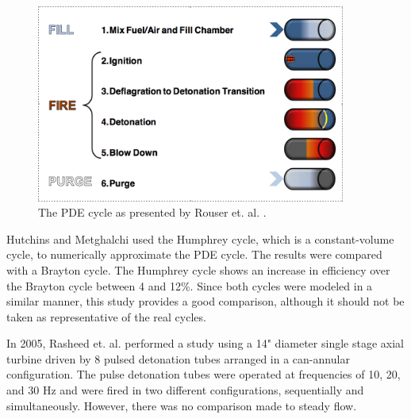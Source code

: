 \documentclass[12pt, letterpaper]{article}
\begin{document}
\begin{figure}[htbp] %
   \centering
   \includegraphics[trim = 5mm 5mm 5mm 5mm,clip,width=4in]{PDEcycle.png} 
   \caption{The PDE cycle as presented by Rouser et. al. \cite{Rouser2011:Performance}.}
   \label{fig:PDEcycle}
\end{figure}

Hutchins and Metghalchi \cite{Hutchins2003:EnergyandExergy} used the Humphrey cycle, which is a constant-volume cycle, to numerically approximate the PDE cycle. The results were compared with a Brayton cycle. The Humphrey cycle shows an increase in efficiency over the Brayton cycle between 4 and 12\%. Since both cycles were modeled in a similar manner, this study provides a good comparison, although it should not be taken as representative of the real cycles.

In 2005, Rasheed et. al. \cite{Rasheed2005:Experimental} performed a study using a 14" diameter single stage axial turbine driven by 8 pulsed detonation tubes arranged in a can-annular configuration. The pulse detonation tubes were operated at frequencies of 10, 20, and 30 Hz and were fired in two different configurations, sequentially and simultaneously. However, there was no comparison made to steady flow.
\end{document}
